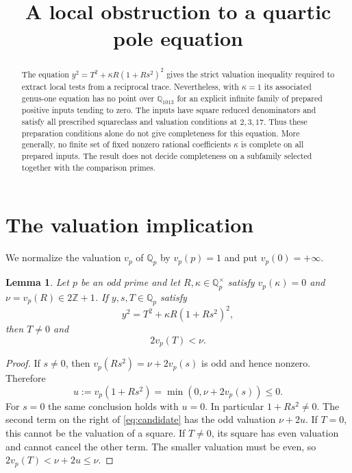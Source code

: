 \documentclass[11pt,a4paper]{article}
\title{A local obstruction to a quartic pole equation}
\author{}\date{}
\newtheorem{lemma}[theorem]{Lemma}
\theoremstyle{definition}\newtheorem{definition}[theorem]{Definition}
\newcommand{\Q}{\mathbb Q}\newcommand{\Z}{\mathbb Z}
\begin{document}
\maketitle
\begin{abstract}
The equation $y^2=T^2+\kappa R(1+Rs^2)^2$ gives the strict
valuation inequality required to extract local tests from a reciprocal
trace. Nevertheless, with $\kappa=1$ its associated genus-one equation
has no point over $\Q_{1013}$ for an explicit infinite family of
prepared positive inputs tending to zero. The inputs have square
reduced denominators and satisfy all prescribed squareclass and
valuation conditions at $2,3,17$. Thus these preparation conditions
alone do not give completeness for this equation. More generally,
no finite set of fixed nonzero rational coefficients $\kappa$
is complete on all prepared inputs. The result does
not decide completeness on a subfamily selected together with the
comparison primes.
\end{abstract}

\section{The valuation implication}
We normalize the valuation $v_p$ of $\Q_p$ by $v_p(p)=1$ and put
$v_p(0)=+\infty$.

\begin{lemma}\label{lem:extraction}
Let $p$ be an odd prime and let $R,\kappa\in\Q_p^\times$ satisfy
$v_p(\kappa)=0$ and $\nu=v_p(R)\in2\Z+1$. If $y,s,T\in\Q_p$
satisfy
\begin{equation}\label{eq:candidate}
                   y^2=T^2+\kappa R(1+Rs^2)^2,
\end{equation}
then $T\ne0$ and
\begin{equation}\label{eq:strict}
                    2v_p(T)<\nu.
\end{equation}
\end{lemma}
\begin{proof}
If $s\ne0$, then $v_p(Rs^2)=\nu+2v_p(s)$ is odd and hence
nonzero. Therefore
\[
 u:=v_p(1+Rs^2)=\min(0,\nu+2v_p(s))\le0.
\]
For $s=0$ the same conclusion holds with $u=0$. In particular
$1+Rs^2\ne0$. The second term on the right of
\eqref{eq:candidate} has the odd valuation $\nu+2u$.
If $T=0$, this cannot be the valuation of a square. If $T\ne0$,
its square has even valuation and cannot cancel the other term.
The smaller valuation must be even, so
$2v_p(T)<\nu+2u\le\nu$.
\end{proof}
\end{document}
